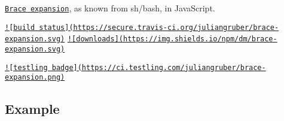 \href{https://www.gnu.org/software/bash/manual/html_node/Brace-Expansion.html}{\tt Brace expansion}, as known from sh/bash, in Java\+Script.

\href{http://travis-ci.org/juliangruber/brace-expansion}{\tt !\mbox{[}build status\mbox{]}(https\+://secure.\+travis-\/ci.\+org/juliangruber/brace-\/expansion.\+svg)} \href{https://www.npmjs.org/package/brace-expansion}{\tt !\mbox{[}downloads\mbox{]}(https\+://img.\+shields.\+io/npm/dm/brace-\/expansion.\+svg)}

\href{https://ci.testling.com/juliangruber/brace-expansion}{\tt !\mbox{[}testling badge\mbox{]}(https\+://ci.\+testling.\+com/juliangruber/brace-\/expansion.\+png)}

\subsection*{Example}


